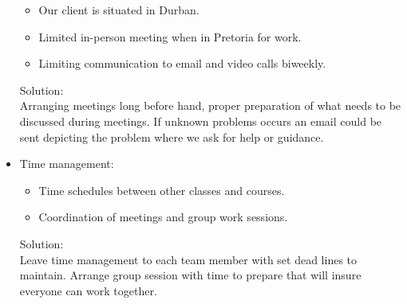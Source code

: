 \documentclass[letterpaper]{article}
\begin{document}
\begin{itemize}
\begin{itemize}
					\item Our client is situated in Durban.
					\item Limited in-person meeting when in Pretoria for work.
					\item Limiting communication to email and video calls biweekly.
				\end{itemize}
				Solution: \\
				Arranging meetings long before hand, proper preparation of what needs to be discussed during meetings. If unknown problems occurs an email could be sent depicting the problem where we ask for help or guidance.
			\item Time management:
				\begin{itemize}
					\item Time schedules between other classes and courses.
					\item Coordination of meetings and group work sessions.
				\end{itemize}
				Solution: \\
				Leave time management to each team member with set dead lines to maintain. Arrange group session with time to prepare that will insure everyone can work together.
		\end{itemize}
		
\end{document}
